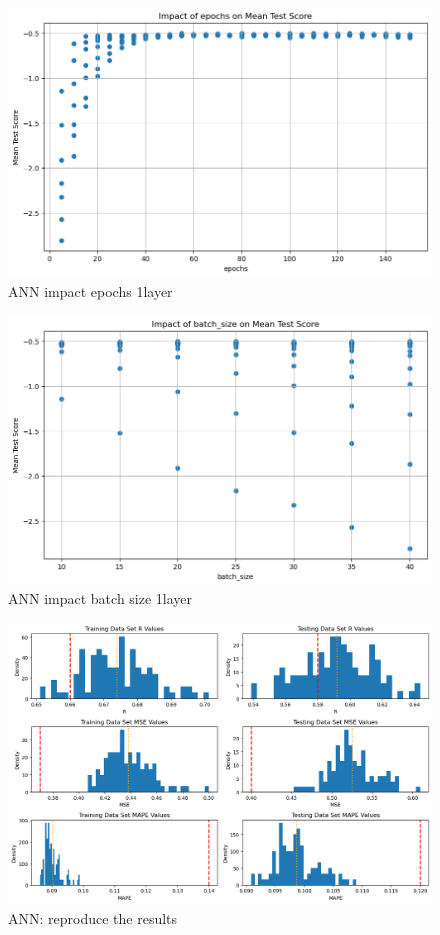 \documentclass{article}
\begin{document}
\begin{figure}
	\centering
	\includegraphics[width=\linewidth]{figures/ANN_impact_epochs_1layer.png}
	\caption{ANN impact epochs 1layer}
	\label{fig:ANN-impact-epochs-1layer}
\end{figure}

\begin{figure}
	\centering
	\includegraphics[width=\linewidth]{figures/ANN_impact_batchsize_1layer.png}
	\caption{ANN impact batch size 1layer}
	\label{fig:ANN-impact-batchsize-1layer}
\end{figure}

\begin{figure}
	\centering
	\includegraphics[width=\linewidth]{figures/ANN_reproduce_the_results.png}
	\caption{ANN: reproduce the results}
	\label{fig:ANN-reproduce-the-results}
\end{figure}
\end{document}
